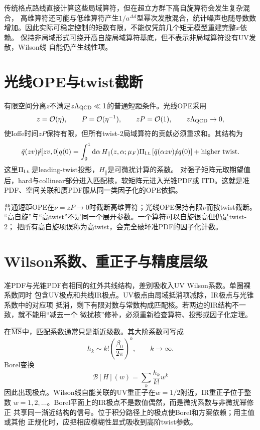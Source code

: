 传统格点路线直接计算这些局域算符，但在超立方群下高自旋算符会发生复杂混合，
高维算符还可能与低维算符产生$1/a^{\Delta d}$型幂次发散混合，统计噪声也随导数数
增加。因此实际可稳定控制的矩数有限，不能仅凭前几个矩无模型重建完整$x$依赖。
保持非局域形式可绕开高自旋局域算符基底，但不表示非局域算符没有UV发散，Wilson线
自能仍产生线性项。

\section{光线OPE与twist截断}

有限空间分离$z$不满足$z\Lambda_{\rm QCD}\ll1$的普通短距条件。光线OPE采用
\begin{equation}
  z=\mathcal O(\eta),\qquad P=\mathcal O(\eta^{-1}),\qquad
  zP=\mathcal O(1),\qquad z\Lambda_{\rm QCD}\to0,
  \label{eq:b04-lightray-counting}
\end{equation}
使Ioffe时间$zP$保持有限，但所有twist-2局域算符的贡献必须重求和。其结构为
\begin{equation}
  \bar q(zv)\slashed v[zv,0]q(0)
  =\int_0^1\mathrm{d}\alpha\,H_\parallel(z,\alpha;\mu_F)
  \Pi_{\rm l.t.}\!\left[\bar q(\alpha zv)\slashed z q(0)\right]
  +\text{higher twist}.
  \label{eq:b04-lightray-ope}
\end{equation}
这里$\Pi_{\rm l.t.}$是leading-twist投影，$H_\parallel$是可微扰计算的系数。
对强子矩阵元取期望值后，hard与collinear部分进入匹配核，软矩阵元进入光锥PDF或
ITD。这就是准PDF、空间关联和赝PDF服从同一类因子化的OPE依据。

普通短距OPE在$\nu=zP\to0$时截断高维算符；光线OPE保持有限$\nu$而按twist截断。
“高自旋”与“高twist”不是同一个展开参数。一个算符可以自旋很高但仍是twist-2；
把所有高自旋项误称为高twist，会完全破坏准PDF的因子化计数。

\section{Wilson系数、重正子与精度层级}

准PDF与光锥PDF有相同的红外共线结构，差别吸收入UV Wilson系数。单圈裸系数同时
包含UV极点和共线IR极点。UV极点由局域抵消项减除，IR极点与光锥系数中的对应项
抵消，剩下有限对数与常数构成匹配核。若两边的IR结构不一致，就不能用“减去一个
微扰核”修补，必须重新检查算符、投影或因子化定理。

在$\overline{\rm MS}$中，匹配系数通常只是渐近级数。其大阶系数可写成
\begin{equation}
  h_k\sim k!\left(\frac{\beta_0}{2\pi}\right)^k,
  \qquad k\to\infty .
  \label{eq:b04-factorial}
\end{equation}
Borel变换
\begin{equation}
  \mathcal B[H](w)=\sum_{k}\frac{h_k}{k!}w^k
  \label{eq:b04-borel}
\end{equation}
因此出现极点。Wilson线自能关联的UV重正子在$w=1/2$附近，IR重正子位于整数
$w=1,2,\ldots$。Borel平面上的IR极点不是数值偶然，而是微扰系数与非微扰幂修正
共享同一渐近结构的信号。位于积分路径上的极点使Borel和方案依赖；用主值或其他
正规化时，应把相应模糊性显式吸收到高阶twist参数。


